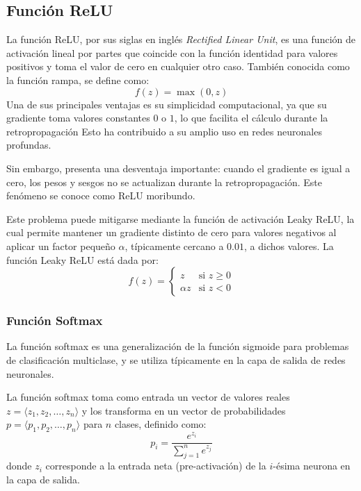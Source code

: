 \subsection{Función ReLU}
La función ReLU, por sus siglas en inglés \textit{Rectified Linear Unit}, es una función 
de activación lineal por partes que coincide con la función identidad para valores positivos y toma el 
valor de cero en cualquier otro caso. También conocida como la función rampa, se define como:
\begin{equation}
    f(z) = \max(0,z)
\end{equation}
Una de sus principales ventajas es su simplicidad computacional, ya que su gradiente toma valores constantes 
$0$ o $1$, lo que facilita el cálculo durante la retropropagación
Esto ha contribuido a su amplio uso en redes neuronales profundas.
\medskip

Sin embargo, presenta una desventaja importante: cuando el gradiente es igual a cero, 
los pesos y sesgos no se actualizan durante la retropropagación. Este fenómeno se conoce 
como \guillemotleft ReLU moribundo\guillemotright.
\medskip

Este problema puede mitigarse mediante la función de activación Leaky ReLU, la cual 
permite mantener un gradiente distinto de cero para valores negativos al aplicar 
un factor pequeño $\alpha$, típicamente cercano a $0.01$, a dichos valores. La función Leaky
ReLU está dada por:
\begin{equation}
    f(z) = \begin{cases}
        z & \text{si } z \ge 0\\
        \alpha z & \text{si } z < 0
    \end{cases}
\end{equation}

\subsubsection{Función Softmax}
La función softmax es una generalización de la función sigmoide para problemas de
clasificación multiclase, y se utiliza típicamente en la capa de salida de redes neuronales.
\medskip

La función softmax toma como entrada un vector de valores reales
$z=\langle z_{1}, z_{2}, \dots, z_{n}\rangle$ y los transforma en un vector de
probabilidades $p=\langle p_{1}, p_{2}, \dots, p_{n}\rangle$ para $n$ clases, definido como:
\begin{equation}
    p_{i} = \frac{e^{z_{i}}}{\sum_{j=1}^{n} e^{z_{j}}}
\end{equation}
donde $z_i$ corresponde a la entrada neta (pre-activación) de la $i$-ésima neurona en la capa de salida.
\medskip

